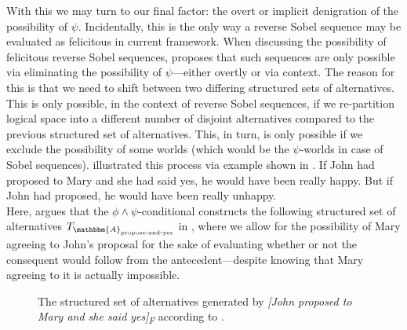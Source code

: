 With this we may turn to our final factor: the overt or implicit denigration of the possibility of $\psi$. Incidentally, this is the only way a reverse Sobel sequence may be evaluated as felicitous in  current framework. When discussing the possibility of felicitous reverse Sobel sequences, \textcite[p.~663]{Ippolito2020} proposes that such sequences are only possible via eliminating the possibility of $\psi$---either overtly or via context. The reason for this is that we need to shift between two differing structured sets of alternatives. This is only possible, in the context of reverse Sobel sequences, if we re-partition logical space into a different number of disjoint alternatives compared to the previous structured set of alternatives. This, in turn, is only possible if we exclude the possibility of some worlds (which would be the $\psi$-worlds in case of Sobel sequences). \textcite{Ippolito2020} illustrated this process via  example shown in .
\pex\label{ex:moss}
\a If John had proposed to Mary and she had said yes, he would have been really happy.
\a But if John had proposed, he would have been really unhappy.\\\emptyfill\parencite[p. 577]{Moss2012}
\xe
Here, \textcite{Ippolito2020} argues that the $\phi\land\psi$-conditional constructs the following structured set of alternatives $T_{\mathbbm{A}_\text{propose-and-yes}}$ in , where we allow for the possibility of Mary agreeing to John's proposal for the sake of evaluating whether or not the consequent would follow from the antecedent---despite knowing that Mary agreeing to it is actually impossible.
\begin{figure}[!htb]
    \centering
    
    \caption{The structured set of alternatives generated by \textit{[John proposed to Mary and she said yes]\textsubscript{F}} according to \textcite{Ippolito2020}.}
\end{figure}


